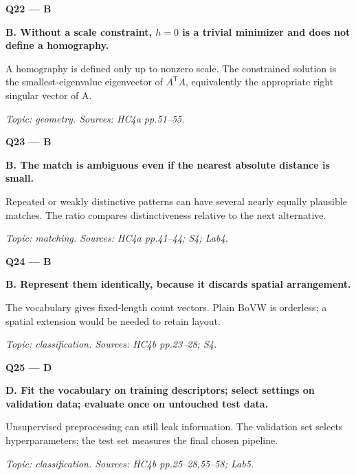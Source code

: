 \documentclass[11pt,a4paper]{article}
\begin{document}
\par\vspace{12pt}
\begin{minipage}{\linewidth}
\textbf{Q22 — B}\par\smallskip
\textbf{B. Without a scale constraint,\allowbreak{} \(h=0\) is a trivial minimizer and does not define a homography.}\par
A homography is defined only up to nonzero scale. The constrained solution is the smallest-eigenvalue eigenvector of \(A^{\mathsf T}A\),\allowbreak{} equivalently the appropriate right singular vector of A.\par
{\small\itshape Topic: geometry. Sources: HC4a pp.51–55.}

\end{minipage}
\par\vspace{12pt}
\begin{minipage}{\linewidth}
\textbf{Q23 — B}\par\smallskip
\textbf{B. The match is ambiguous even if the nearest absolute distance is small.}\par
Repeated or weakly distinctive patterns can have several nearly equally plausible matches. The ratio compares distinctiveness relative to the next alternative.\par
{\small\itshape Topic: matching. Sources: HC4a pp.41–44; S4; Lab4.}

\end{minipage}
\par\vspace{12pt}
\begin{minipage}{\linewidth}
\textbf{Q24 — B}\par\smallskip
\textbf{B. Represent them identically,\allowbreak{} because it discards spatial arrangement.}\par
The vocabulary gives fixed-length count vectors. Plain BoVW is orderless; a spatial extension would be needed to retain layout.\par
{\small\itshape Topic: classification. Sources: HC4b pp.23–28; S4.}

\end{minipage}
\par\vspace{12pt}
\begin{minipage}{\linewidth}
\textbf{Q25 — D}\par\smallskip
\textbf{D. Fit the vocabulary on training descriptors; select settings on validation data; evaluate once on untouched test data.}\par
Unsupervised preprocessing can still leak information. The validation set selects hyperparameters; the test set measures the final chosen pipeline.\par
{\small\itshape Topic: classification. Sources: HC4b pp.25–28,\allowbreak{}55–58; Lab5.}

\end{minipage}
\end{document}
